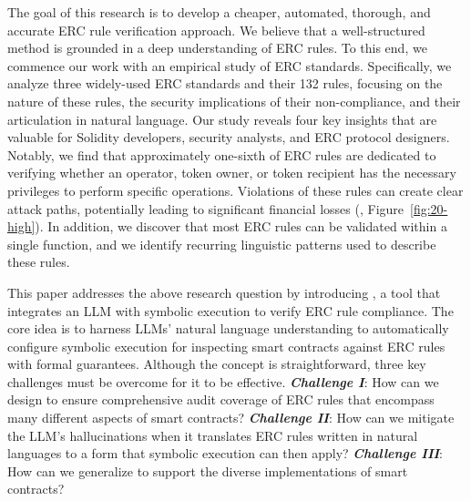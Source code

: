 %
The goal of this research is to develop a cheaper, automated, thorough, and accurate ERC rule verification approach. 
%
We believe that a well-structured method is grounded in a deep understanding of ERC rules. To this end, 
we commence our work with an empirical study of ERC standards. Specifically, we analyze three 
widely-used ERC standards and their 132 rules, 
focusing on the nature of these rules, the 
security implications of their non-compliance, and their articulation in natural language. 
Our study reveals four key insights that are valuable for Solidity developers, security analysts, and 
ERC protocol designers. Notably, we find that approximately one-sixth of ERC rules are dedicated to 
verifying whether an operator, token owner, or token recipient has the necessary privileges to perform 
specific operations. Violations of these rules can create clear attack paths, potentially leading to 
significant financial losses (\eg, Figure~\ref{fig:20-high}). 
In addition, we discover that most 
ERC rules can be validated within a single function, 
and we identify recurring linguistic patterns used 
to describe these rules.







%
This paper addresses the above research question by introducing \emph{\Tool}, 
a tool that integrates an LLM with symbolic execution to verify ERC rule compliance. 
The core idea is to harness LLMs’ natural language understanding 
to automatically configure symbolic execution for inspecting smart contracts 
against ERC rules with formal guarantees. 
Although the concept is straightforward, 
three key challenges must be overcome for it to be effective.
\textbf{\textit{Challenge I}}: How can we design \Tool{} to ensure comprehensive audit coverage of ERC rules that encompass many different aspects of smart contracts?
\textbf{\textit{Challenge II}}: 
How can we mitigate the LLM's hallucinations when 
it translates ERC rules written in natural languages to a form that symbolic execution can then apply?
\textbf{\textit{Challenge III}}: How can we generalize \Tool{} to support the diverse implementations of smart contracts? 




